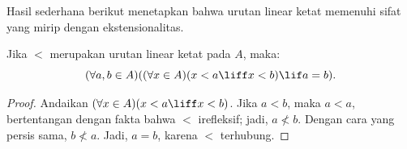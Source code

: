 \documentclass[../../../include/open-logic-section]{subfiles}
\begin{document}
Hasil sederhana berikut menetapkan bahwa urutan linear ketat memenuhi sifat
yang mirip dengan ekstensionalitas.

\begin{prop}
Jika $<$ merupakan urutan linear ketat pada $A$, maka:
\[
  (\forall a, b \in A)((\forall x \in A)(x < a \liff x < b) \lif a = b).
\]
\end{prop}

\begin{proof}
Andaikan $(\forall x \in A)(x < a \liff x < b)$. Jika $a < b$, maka $a < a$,
bertentangan dengan fakta bahwa $<$ irefleksif; jadi, $a \nless b$. Dengan
cara yang persis sama, $b \nless a$. Jadi, $a = b$, karena $<$ terhubung.
\end{proof}
\end{document}
